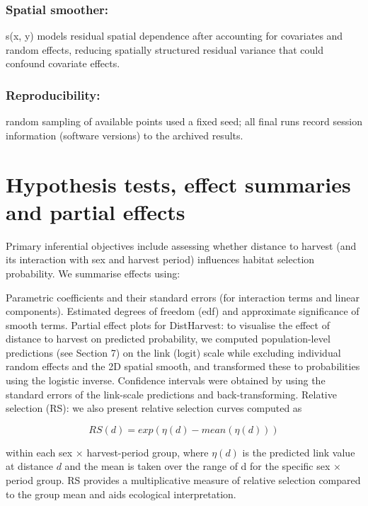 \documentclass[
  letterpaper,
  DIV=11,
  numbers=noendperiod]{scrartcl}
\begin{document}
\subsubsection{Spatial smoother:}\label{spatial-smoother}

s(x, y) models residual spatial dependence after accounting for
covariates and random effects, reducing spatially structured residual
variance that could confound covariate effects.

\subsubsection{Reproducibility:}\label{reproducibility}

random sampling of available points used a fixed seed; all final runs
record session information (software versions) to the archived results.

\section{Hypothesis tests, effect summaries and partial
effects}\label{hypothesis-tests-effect-summaries-and-partial-effects}

Primary inferential objectives include assessing whether distance to
harvest (and its interaction with sex and harvest period) influences
habitat selection probability. We summarise effects using:

Parametric coefficients and their standard errors (for interaction terms
and linear components). Estimated degrees of freedom (edf) and
approximate significance of smooth terms. Partial effect plots for
DistHarvest: to visualise the effect of distance to harvest on predicted
probability, we computed population-level predictions (see Section 7) on
the link (logit) scale while excluding individual random effects and the
2D spatial smooth, and transformed these to probabilities using the
logistic inverse. Confidence intervals were obtained by using the
standard errors of the link-scale predictions and back-transforming.
Relative selection (RS): we also present relative selection curves
computed as

\[
RS(d) = exp( η(d) − mean( η(d) ) )
\]

within each sex × harvest-period group, where \(η(d)\) is the predicted
link value at distance \(d\) and the mean is taken over the range of d
for the specific sex × period group. RS provides a multiplicative
measure of relative selection compared to the group mean and aids
ecological interpretation.
\end{document}
